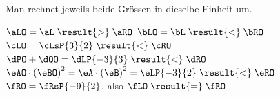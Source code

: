 Man rechnet jeweils beide Grössen in dieselbe Einheit um.
\begin{abcliste}
\abc $\aLO = \aL \;\result{>}\; \aRO$
\abc $\bLO = \bL \;\result{<}\; \bRO$
\abc $\cLO = \cLsP{3}{2} \;\result{<}\; \cRO$
\abc $\dPO + \dQO = \dLP{-3}{3} \;\result{<}\; \dRO$
\abc $\eAO\cdot\left(\eBO\right)^2 = \eA\cdot\left(\eB\right)^2 = \eLP{-3}{2} \;\result{<}\; \eRO$
\abc $\fRO = \fRsP{-9}{2}$, also $\fLO \;\result{=}\; \fRO$
\end{abcliste}
